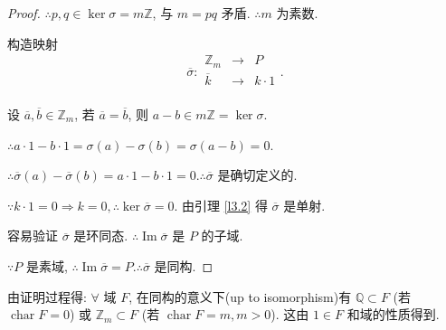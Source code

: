 \documentclass{ctexart}
\begin{document}
\begin{proof}
    $\therefore p,q\in\ker\sigma=m\mathbb{Z}$, 与 $m=pq$ 矛盾. $\therefore m$ 为素数.

    构造映射
    \[\overline{\sigma}:\begin{array}{rcl}
        \mathbb{Z}_m & \to & P \\
        \overline{k} & \to & k\cdot1 \\
    \end{array}.\]

    设 $\overline{a},\overline{b}\in\mathbb{Z}_m$, 若 $\overline{a}=\overline{b}$, 则 $a-b\in m\mathbb{Z}=\ker\sigma$.

    $\therefore a\cdot1-b\cdot1=\sigma(a)-\sigma(b)=\sigma(a-b)=0$.

    $\therefore\overline{\sigma}(a)-\overline{\sigma}(b)=a\cdot1-b\cdot1=0.\therefore\overline{\sigma}$ 是确切定义的.

    $\because k\cdot1=0\Rightarrow k=0,\therefore\ker\overline{\sigma}=0$. 由引理 \ref{l3.2} 得 $\overline{\sigma}$ 是单射.

    容易验证 $\overline{\sigma}$ 是环同态. $\therefore\operatorname{Im}\overline{\sigma}$ 是 $P$ 的子域.

    $\because P$ 是素域, $\therefore\operatorname{Im}\overline{\sigma}=P.\therefore\overline{\sigma}$ 是同构.
\end{proof}
由证明过程得: $\forall$ 域 $F$, 在同构的意义下(up to isomorphism)有 $\mathbb{Q}\subset F$ (若 $\operatorname{char}F=0$) 或 $\mathbb{Z}_m\subset F$ (若 $\operatorname{char}F=m,m>0$). 这由 $1\in F$ 和域的性质得到.
\end{document}
